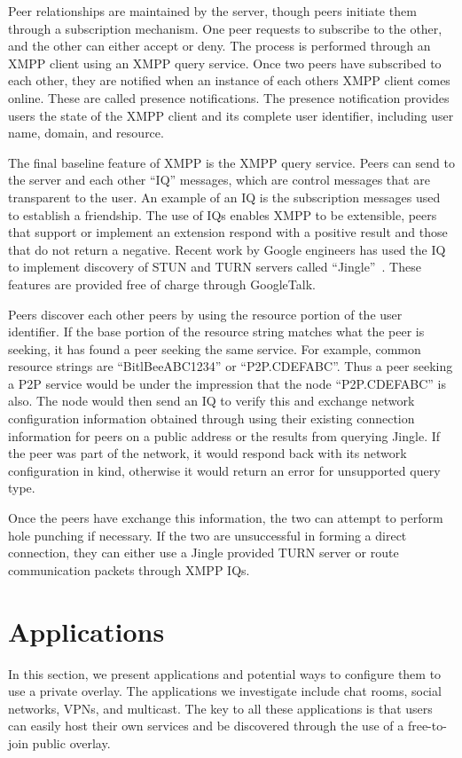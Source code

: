 \documentclass[conference]{IEEEtran}
\begin{document}
Peer relationships are maintained by the server, though peers initiate them
through a subscription mechanism.  One peer requests to subscribe to the other,
and the other can either accept or deny.  The process is performed through an
XMPP client using an XMPP query service.  Once two peers have subscribed to
each other, they are notified when an instance of each others XMPP client comes
online.  These are called presence notifications.  The presence notification
provides users the state of the XMPP client and its complete user identifier,
including user name, domain, and resource.

The final baseline feature of XMPP is the XMPP query service.  Peers can send
to the server and each other ``IQ'' messages, which are control messages that
are transparent to the user.  An example of an IQ is the subscription messages
used to establish a friendship.  The use of IQs enables XMPP to be extensible,
peers that support or implement an extension respond with a positive result and
those that do not return a negative.  Recent work by Google engineers has used
the IQ to implement discovery of STUN and TURN servers called
``Jingle''~\cite{jingle}.  These features are provided free of charge through
GoogleTalk.

Peers discover each other peers by using the resource portion of the user
identifier.  If the base portion of the resource string matches what the peer
is seeking, it has found a peer seeking the same service.  For example, common
resource strings are ``BitlBeeABC1234'' or ``P2P.CDEFABC''.  Thus a peer
seeking a P2P service would be under the impression that the node
``P2P.CDEFABC'' is also.  The node would then send an IQ to verify this and
exchange network configuration information obtained through using their
existing connection information for peers on a public address or the results
from querying Jingle.  If the peer was part of the network, it would respond
back with its network configuration in kind, otherwise it would return an error
for unsupported query type.

Once the peers have exchange this information, the two can attempt to perform
hole punching if necessary.  If the two are unsuccessful in forming a direct
connection, they can either use a Jingle provided TURN server or route
communication packets through XMPP IQs.

\section{Applications}
\label{applications}
In this section, we present applications and potential ways to configure them
to use a private overlay.  The applications we investigate include chat rooms,
social networks, VPNs, and multicast.  The key to all these applications is that
users can easily host their own services and be discovered through the use of
a free-to-join public overlay.
\end{document}
